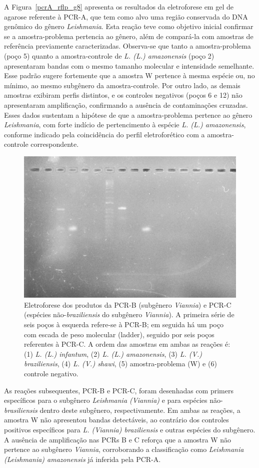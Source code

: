 A Figura~\ref{pcrA_rflp_g8} apresenta os resultados da eletroforese em gel de agarose referente à PCR-A, que tem como alvo uma região conservada do DNA genômico do gênero
 \textit{Leishmania}. Esta reação teve como objetivo inicial confirmar se a amostra-problema pertencia ao gênero, além de compará-la com amostras de referência previamente 
 caracterizadas. Observa-se que tanto a amostra-problema (poço 5) quanto a amostra-controle de \textit{L. (L.) amazonensis} (poço 2) apresentaram bandas com o mesmo tamanho 
 molecular e intensidade semelhante. Esse padrão sugere fortemente que a amostra W pertence à mesma espécie ou, no mínimo, ao mesmo subgênero da amostra-controle. Por outro 
 lado, as demais amostras  exibiram perfis distintos, e os controles negativos (poços 6 e 12) não apresentaram amplificação, confirmando a ausência de contaminações cruzadas.
Esses dados sustentam a hipótese de que a amostra-problema pertence ao gênero \textit{Leishmania}, com forte indício de pertencimento à espécie \textit{L. (L.) amazonensis}, 
conforme indicado pela coincidência do perfil eletroforético com a amostra-controle correspondente.

\begin{figure}
 \centering
 \includegraphics[width=.4\textwidth]{fig/pcrBeC_g8.jpg}
 \caption{Eletroforese dos produtos da PCR-B (subgênero \textit{Viannia}) e PCR-C (espécies não-\textit{braziliensis} do subgênero \textit{Viannia}). 
 A primeira série de seis poços à esquerda refere-se à PCR-B; em seguida há um poço com escada de peso molecular (ladder), seguido por seis poços referentes 
 à PCR-C. A ordem das amostras em ambas as reações é: (1) \textit{L. (L.) infantum}, (2) \textit{L. (L.) amazonensis}, (3) \textit{L. (V.) braziliensis}, 
 (4) \textit{L. (V.) shawi}, (5) amostra-problema (W) e (6) controle negativo.}
 \label{pcrBC}
 \end{figure}

As reações subsequentes, PCR-B e PCR-C, foram desenhadas com primers específicos para o subgênero \textit{Leishmania (Viannia)} e para espécies não-\textit{brasiliensis} dentro 
deste subgênero, respectivamente. Em ambas as reações, a amostra W não apresentou bandas detectáveis, ao contrário dos controles positivos específicos para \textit{L. (Viannia) 
braziliensis} e outras espécies do subgênero. A ausência de amplificação nas PCRs B e C reforça que a amostra W não pertence ao subgênero \textit{Viannia}, corroborando a classificação 
como \textit{Leishmania (Leishmania) amazonensis} já inferida pela PCR-A.

